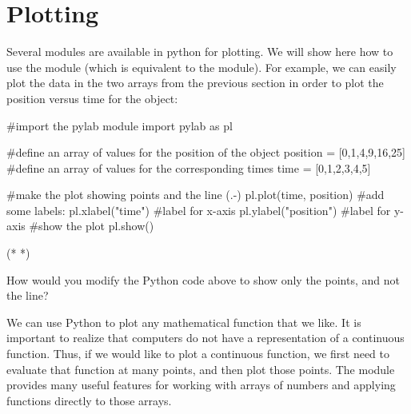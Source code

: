 \section{Plotting}
Several modules are available in python for plotting. We will show here how to use the  module (which is equivalent to the  module). For example, we can easily plot the data in the two arrays from the previous section in order to plot the position versus time for the object:
\begin{python}[caption=Plotting two arrays]
#import the pylab module
import pylab as pl

#define an array of values for the position of the object
position = [0,1,4,9,16,25]
#define an array of values for the corresponding times
time = [0,1,2,3,4,5]

#make the plot showing points and the line (.-)
pl.plot(time, position)
#add some labels:
pl.xlabel("time") #label for x-axis
pl.ylabel("position") #label for y-axis
#show the plot
pl.show()

\end{python}
\begin{poutput}
(*   *)
\end{poutput}

\begin{checkpointSA}{How would you modify the Python code above to show only the points, and not the line?}
\end{checkpointSA}

We can use Python to plot any mathematical function that we like. It is important to realize that computers do not have a representation of a continuous function. Thus, if we would like to plot a continuous function, we first need to evaluate that function at many points, and then plot those points. The  module provides many useful features for working with arrays of numbers and applying functions directly to those arrays. 

